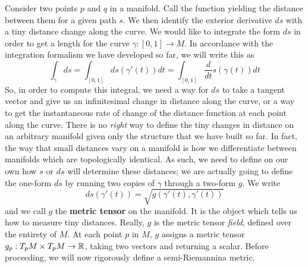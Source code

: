 Consider two points $p$ and $q$ in a manifold.  Call the function yielding the distance between them for a given path $s$.  We then identify the exterior derivative $ds$ with a tiny distance change along the curve.  We would like to integrate the form $ds$ in order to get a length for the curve $\gamma: [0, 1] \to M$.  In  accordance with the integration formalism we have developed so far, we will write this as 
\begin{equation*}
	\int_\gamma ds = \int_{[0, 1]} ds(\gamma'(t)) dt = \int_{[0, 1]}\frac{d}{dt}s(\gamma(t)) dt
\end{equation*}
So, in order to compute this integral, we need a way for $ds$ to take a tangent vector and give us an infinitesimal change in distance along the curve, or a way to get the instantaneous rate of change of the distance function at each point along the curve.  There is no \textit{right} way to define the tiny changes in distance on an arbitrary manifold given only the structure that we have built so far.  In fact, the way that small distances vary on a manifold is how we differentiate between manifolds which are topologically identical.  As such, we need to define on our own how $s$ or $ds$ will determine these distances; we are actually going to define the one-form $ds$ by running two copies of $\gamma$ through a two-form $g$.  We write
\begin{equation*}
	ds(\gamma'(t)) = \sqrt{g(\gamma'(t), \gamma'(t)) }
\end{equation*}
and we call $g$ the \textbf{metric tensor} on the manifold.  It is the object which tells us how to measure tiny distances.  Really, $g$ is the metric tensor \textit{field}, defined over the entirety of $M$.  At each point $p$ in $M$, $g$ assigns a metric tensor $g_p: T_pM \times T_pM \to \mathbb{R}$, taking two vectors and returning a scalar.  Before proceeding, we will now rigorously define a semi-Riemannina metric.\\

